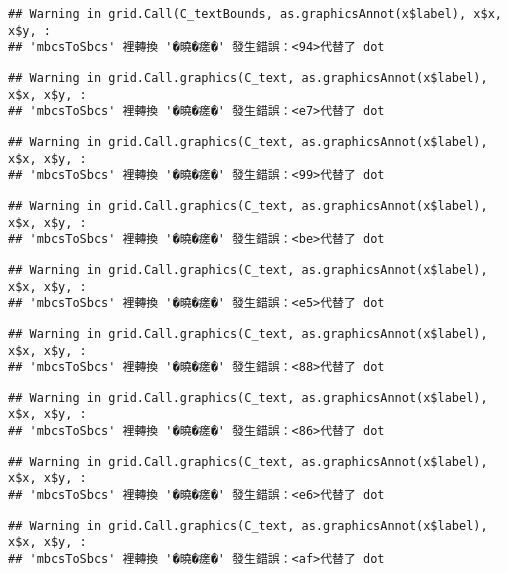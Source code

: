 \documentclass[
]{article}
\begin{document}
\begin{verbatim}
## Warning in grid.Call(C_textBounds, as.graphicsAnnot(x$label), x$x, x$y, :
## 'mbcsToSbcs' 裡轉換 '�曉�瘥�' 發生錯誤：<94>代替了 dot
\end{verbatim}

\begin{verbatim}
## Warning in grid.Call.graphics(C_text, as.graphicsAnnot(x$label), x$x, x$y, :
## 'mbcsToSbcs' 裡轉換 '�曉�瘥�' 發生錯誤：<e7>代替了 dot
\end{verbatim}

\begin{verbatim}
## Warning in grid.Call.graphics(C_text, as.graphicsAnnot(x$label), x$x, x$y, :
## 'mbcsToSbcs' 裡轉換 '�曉�瘥�' 發生錯誤：<99>代替了 dot
\end{verbatim}

\begin{verbatim}
## Warning in grid.Call.graphics(C_text, as.graphicsAnnot(x$label), x$x, x$y, :
## 'mbcsToSbcs' 裡轉換 '�曉�瘥�' 發生錯誤：<be>代替了 dot
\end{verbatim}

\begin{verbatim}
## Warning in grid.Call.graphics(C_text, as.graphicsAnnot(x$label), x$x, x$y, :
## 'mbcsToSbcs' 裡轉換 '�曉�瘥�' 發生錯誤：<e5>代替了 dot
\end{verbatim}

\begin{verbatim}
## Warning in grid.Call.graphics(C_text, as.graphicsAnnot(x$label), x$x, x$y, :
## 'mbcsToSbcs' 裡轉換 '�曉�瘥�' 發生錯誤：<88>代替了 dot
\end{verbatim}

\begin{verbatim}
## Warning in grid.Call.graphics(C_text, as.graphicsAnnot(x$label), x$x, x$y, :
## 'mbcsToSbcs' 裡轉換 '�曉�瘥�' 發生錯誤：<86>代替了 dot
\end{verbatim}

\begin{verbatim}
## Warning in grid.Call.graphics(C_text, as.graphicsAnnot(x$label), x$x, x$y, :
## 'mbcsToSbcs' 裡轉換 '�曉�瘥�' 發生錯誤：<e6>代替了 dot
\end{verbatim}

\begin{verbatim}
## Warning in grid.Call.graphics(C_text, as.graphicsAnnot(x$label), x$x, x$y, :
## 'mbcsToSbcs' 裡轉換 '�曉�瘥�' 發生錯誤：<af>代替了 dot
\end{verbatim}
\end{document}
